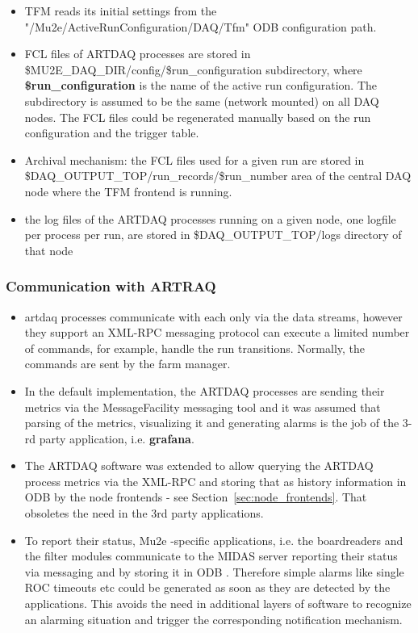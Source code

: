 \begin{itemize}
\item 
  TFM reads its initial settings from the "/Mu2e/ActiveRunConfiguration/DAQ/Tfm"
  ODB configuration path.
\item
  FCL files of ARTDAQ processes are stored in \$MU2E\_DAQ\_DIR/config/\$run\_configuration
  subdirectory, where {\bf \$run\_configuration} is the name of the active run
  configuration. The subdirectory is assumed to be the same (network mounted)
  on all DAQ nodes.
  The FCL files could be regenerated manually based on the run configuration
  and the trigger table.
\item
  Archival mechanism: the FCL files used for a given run are stored in \\
  \$DAQ\_OUTPUT\_TOP/run\_records/\$run\_number area of the central DAQ node
  where the TFM frontend is running.
\item
  the log files of the ARTDAQ processes running on a given node, one logfile
  per process per run,
  are stored in \$DAQ\_OUTPUT\_TOP/logs directory of that node
\end{itemize}


\subsubsection{Communication with ARTRAQ}

\begin{itemize}
\item
  artdaq processes communicate with each only via the data streams, however
  they support an XML-RPC messaging protocol can execute a limited number
  of commands, for example, handle the run transitions. Normally, the commands
  are sent by the farm manager.
\item
  In the default implementation, the ARTDAQ processes are sending their metrics
  via the MessageFacility messaging tool and it was assumed that parsing of
  the metrics, visualizing it and generating alarms is the job of the 3-rd
  party application, i.e. {\bf grafana}.
\item
  The ARTDAQ software was extended to allow querying the ARTDAQ process
  metrics via the XML-RPC and storing that as history information
  in ODB by the node frontends - see Section~\ref{sec:node_frontends}.
  That obsoletes the need in the 3rd party applications. 
\item
  To report their status, Mu2e -specific applications, i.e. the boardreaders
  and the filter modules communicate to the MIDAS server reporting their status 
  via messaging and by storing it in ODB . Therefore simple alarms like single ROC
  timeouts etc could be generated as soon as they are detected by the applications. 
  This avoids the need in additional layers of software to recognize an alarming
  situation and trigger the corresponding notification mechanism.
\end{itemize}


